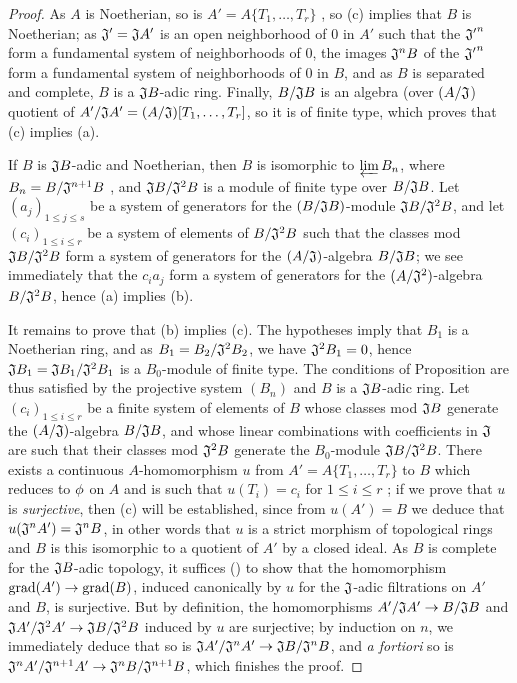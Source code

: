 \begin{proof}
\label{proof-0.7.5.5}
As $A$ is Noetherian, so is $A'=A\{T_1,\dots,T_r\}$ , so
(c) implies that $B$ is Noetherian; as $\mathfrak{J}'=\mathfrak{J}A'$ is an open neighborhood
of $0$ in $A'$ such that the ${\mathfrak{J}'}^n$ form a fundamental system of neighborhoods of
$0$, the images $\mathfrak{J}^n B$ of the ${\mathfrak{J}'}^n$ form a fundamental system of
neighborhoods of $0$ in $B$, and as $B$ is separated and complete, $B$ is a $\mathfrak{J}B$-adic
ring. Finally, $B/\mathfrak{J}B$ is an algebra (over $(A/\mathfrak{J}$) quotient of
$A'/\mathfrak{J}A'=(A/\mathfrak{J})[T_1,\dots,T_r]$, so it is of finite type, which proves that
(c) implies (a).

If $B$ is $\mathfrak{J}B$-adic and Noetherian, then $B$ is isomorphic to $\varprojlim B_n$, where
$B_n=B/\mathfrak{J}^{n+1}B$ , and $\mathfrak{J}B/\mathfrak{J}^2 B$
is a module of finite type over $B/\mathfrak{J}B$. Let $(a_j)_{1\leqslant j\leqslant s}$ be a
system of generators for the $(B/\mathfrak{J}B)$-module $\mathfrak{J}B/\mathfrak{J}^2 B$, and let
$(c_i)_{1\leqslant i\leqslant r}$ be a system of elements of $B/\mathfrak{J}^2 B$ such that the
classes
mod $\mathfrak{J}B/\mathfrak{J}^2 B$ form a system of generators for the $(A/\mathfrak{J})$-algebra
$B/\mathfrak{J}B$; we see immediately that the $c_i a_j$ form a system of generators for the
$(A/\mathfrak{J}^2)$-algebra $B/\mathfrak{J}^2 B$, hence (a) implies (b).

It remains to prove that (b) implies (c). The hypotheses imply that $B_1$ is a Noetherian ring, and
as $B_1=B_2/\mathfrak{J}^2 B_2$, we have $\mathfrak{J}^2 B_1=0$, hence
$\mathfrak{J}B_1=\mathfrak{J}B_1/\mathfrak{J}^2 B_1$ is a $B_0$-module of finite type. The
conditions of Proposition  are thus satisfied by the projective
system $(B_n)$ and $B$ is a $\mathfrak{J}B$-adic ring. Let $(c_i)_{1\leqslant i\leqslant r}$ be a
finite system of elements of $B$ whose classes mod $\mathfrak{J}B$ generate the
$(A/\mathfrak{J})$-algebra $B/\mathfrak{J}B$, and whose linear combinations with coefficients in
$\mathfrak{J}$ are such that their classes mod $\mathfrak{J}^2 B$ generate the $B_0$-module
$\mathfrak{J}B/\mathfrak{J}^2 B$. There exists a continuous $A$-homomorphism $u$ from
$A'=A\{T_1,\dots,T_r\}$ to $B$ which reduces to $\phi$ on $A$ and is such that $u(T_i)=c_i$ for
$1\leqslant i\leqslant r$ ; if we prove that $u$ is {\em surjective},
then (c) will be established, since from $u(A')=B$ we deduce that
$u(\mathfrak{J}^n A')=\mathfrak{J}^n B$, in other words that $u$ is a strict morphism of topological
rings and $B$ is this isomorphic to a quotient of $A'$ by a closed ideal. As $B$ is complete for the
$\mathfrak{J}B$-adic topology, it suffices (\cite[p.~18--07]{I-1}) to show that the homomorphism
${\mathop{\mathrm{grad}}\nolimits}(A')\to{\mathop{\mathrm{grad}}\nolimits}(B)$, induced canonically by $u$ for the $\mathfrak{J}$-adic filtrations on
$A'$ and $B$, is surjective. But by definition, the homomorphisms
$A'/\mathfrak{J}A'\to B/\mathfrak{J}B$ and
$\mathfrak{J}A'/\mathfrak{J}^2 A'\to\mathfrak{J}B/\mathfrak{J}^2 B$ induced by $u$ are surjective;
by induction on $n$, we immediately deduce that so is
$\mathfrak{J}A'/\mathfrak{J}^n A'\to\mathfrak{J}B/\mathfrak{J}^n B$, and {\em a fortiori} so is
$\mathfrak{J}^n A'/\mathfrak{J}^{n+1}A'\to\mathfrak{J}^n B/\mathfrak{J}^{n+1}B$, which finishes the
proof.
\end{proof}

